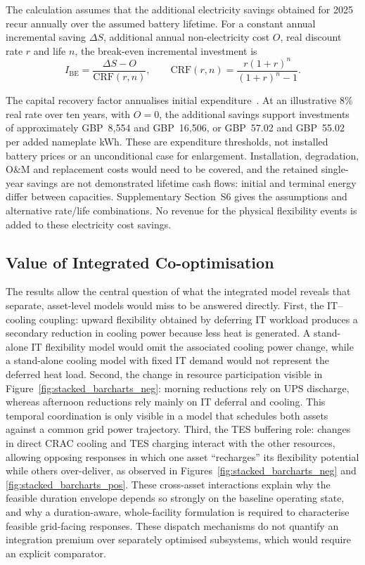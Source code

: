 \documentclass[lettersize,journal]{IEEEtran}
\providecommand{\DIFadd}[1]{{\color{blue}#1}}
\begin{document}
\DIFadd{The calculation assumes that the additional electricity savings obtained for 2025 recur annually over the assumed battery lifetime. For a constant annual incremental saving $\Delta S$, additional annual non-electricity cost $O$, real discount rate $r$ and life $n$, the break-even incremental investment is
}\begingroup\color{blue}
\begin{equation}
I_{\mathrm{BE}}=\frac{\Delta S-O}{\mathrm{CRF}(r,n)},\qquad
\mathrm{CRF}(r,n)=\frac{r(1+r)^n}{(1+r)^n-1}.
\label{eq:ups-investment}
\end{equation}
\endgroup
\DIFadd{The capital recovery factor annualises initial expenditure~\cite{sam_crf}. At an illustrative 8\% real rate over ten years, with $O=0$, the additional savings support investments of approximately GBP~8,554 and GBP~16,506, or GBP~57.02 and GBP~55.02 per added nameplate kWh. These are expenditure thresholds, not installed battery prices or an unconditional case for enlargement. Installation, degradation, O\&M and replacement costs would need to be covered, and the retained single-year savings are not demonstrated lifetime cash flows: initial and terminal energy differ between capacities. Supplementary Section~S6 gives the assumptions and alternative rate/life combinations. No revenue for the physical flexibility events is added to these electricity cost savings.

}


\subsection{\DIFadd{Value of Integrated Co-optimisation}}\label{sec:integration-value}
\DIFadd{The results allow the central question of what the integrated model reveals that separate, asset-level models would miss to be answered directly. First, the IT--cooling coupling: upward flexibility obtained by deferring IT workload produces a secondary reduction in cooling power because less heat is generated. A stand-alone IT flexibility model would omit the associated cooling power change, while a stand-alone cooling model with fixed IT demand would not represent the deferred heat load. Second, the change in resource participation visible in Figure~\ref{fig:stacked_barcharts_neg}: morning reductions rely on UPS discharge, whereas afternoon reductions rely mainly on IT deferral and cooling. This temporal coordination is only visible in a model that schedules both assets against a common grid power trajectory. Third, the TES buffering role: changes in direct CRAC cooling and TES charging interact with the other resources, allowing opposing responses in which one asset ``recharges'' its flexibility potential while others over-deliver, as observed in Figures~\ref{fig:stacked_barcharts_neg} and \ref{fig:stacked_barcharts_pos}. These cross-asset interactions explain why the feasible duration envelope depends so strongly on the baseline operating state, and why a duration-aware, whole-facility formulation is required to characterise feasible grid-facing responses. These dispatch mechanisms do not quantify an integration premium over separately optimised subsystems, which would require an explicit comparator.

}
\end{document}
